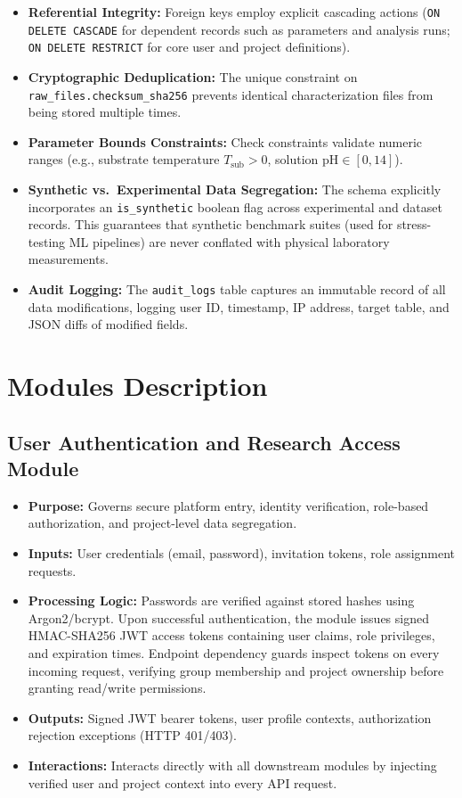 \documentclass[12pt,a4paper,oneside]{report}
\begin{document}
{{{\begin{itemize}
    \item \textbf{Referential Integrity:} Foreign keys employ explicit cascading actions (\texttt{ON DELETE CASCADE} for dependent records such as parameters and analysis runs; \texttt{ON DELETE RESTRICT} for core user and project definitions).
    \item \textbf{Cryptographic Deduplication:} The unique constraint on \texttt{raw\_files.checksum\_sha256} prevents identical characterization files from being stored multiple times.
    \item \textbf{Parameter Bounds Constraints:} Check constraints validate numeric ranges (e.g., substrate temperature $T_{\text{sub}} > 0$, solution $\text{pH} \in [0, 14]$).
    \item \textbf{Synthetic vs.\ Experimental Data Segregation:} The schema explicitly incorporates an \texttt{is\_synthetic} boolean flag across experimental and dataset records. This guarantees that synthetic benchmark suites (used for stress-testing ML pipelines) are never conflated with physical laboratory measurements.
    \item \textbf{Audit Logging:} The \texttt{audit\_logs} table captures an immutable record of all data modifications, logging user ID, timestamp, IP address, target table, and JSON diffs of modified fields.
\end{itemize}


\section{Modules Description}

\subsection{User Authentication and Research Access Module}

\begin{itemize}
    \item \textbf{Purpose:} Governs secure platform entry, identity verification, role-based authorization, and project-level data segregation.
    \item \textbf{Inputs:} User credentials (email, password), invitation tokens, role assignment requests.
    \item \textbf{Processing Logic:} Passwords are verified against stored hashes using Argon2/bcrypt. Upon successful authentication, the module issues signed HMAC-SHA256 JWT access tokens containing user claims, role privileges, and expiration times. Endpoint dependency guards inspect tokens on every incoming request, verifying group membership and project ownership before granting read/write permissions.
    \item \textbf{Outputs:} Signed JWT bearer tokens, user profile contexts, authorization rejection exceptions (HTTP 401/403).
    \item \textbf{Interactions:} Interacts directly with all downstream modules by injecting verified user and project context into every API request.
\end{itemize}

}}}
\end{document}
